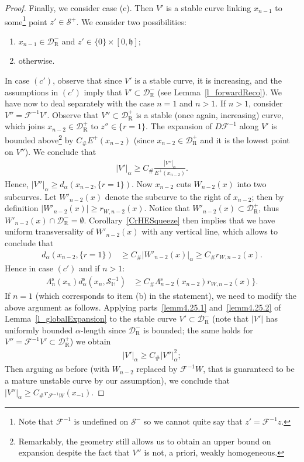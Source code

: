 \documentclass[10pt]{amsart}
\theoremstyle{definition}\newtheorem{defi}[theo]{Definition}\newtheorem{rema}[theo]{Remark}\newtheorem{exam}[theo]{Example}\newtheorem{exem}[theo]{Example}\newtheorem{nota}[theo]{Notation}
\newcommand{\ct}{r}
\newcommand{\const}{C_\#}
\newcommand{\inv}{^{-1}}
\newcommand{\stable}{\text{s}}
\newcommand{\homo}{\mathbb{H}}
\newcommand{\cm}{\mathcal{F}}
\newcommand{\cell}{\mathcal{D}}
\newcommand{\slopeb}{\mathfrak{h}}
\newcommand{\recoPrivate}{\mathrm{R}}
\newcommand{\reco}{{\cell^-_{\recoPrivate}}}
\newcommand{\backReco}{{\cell^+_{\recoPrivate}}}
\newcommand{\dadm}[1]{\dadmPrivate^{#1}}
\newcommand{\dadmPrivate}{d\adm}
\newcommand{\ds}{\dadmPrivate^{\stable}}
\newcommand{\singPrivate}{\mathcal{S}}
\newcommand{\hsing}[1]{{\singPrivate}_\homo^{#1}}
\newcommand{\singForward}[1]{\singPrivate^+_{#1}}
\newcommand{\singBackward}[1]{\singPrivate^-_{#1}}
\newcommand{\adm}{_{\alpha^{+}}}
\newcommand{\admName}{\alpha^{+}}
\renewcommand{\admName}{\alpha}
\renewcommand{\adm}{_{\alpha}}
\renewcommand{\dadm}{d\adm}
\begin{document}
\begin{proof}
Finally, we consider case (c). Then $V'$ is a stable curve linking $x_{n-1}$ to some\footnote{ Note that $\cm\inv$ is undefined on $\singBackward{}$ so we cannot quite say that $z' = \cm\inv z$.} point $z'\in\singForward{}$. We consider two possibilities:
\begin{enumerate}
\item[$(c')$] $x_{n-1}\in\reco$ and $z'\in\{0\}\times[0,\slopeb]$;
\item[$(c'')$] otherwise.
\end{enumerate}
In case $(c')$, observe that since $V'$ is a stable curve, it is increasing, and the assumptions in $(c')$ imply that $V'\subset\reco$ (see Lemma~\ref{l_forwardReco}). We have now to deal separately with the case $n = 1$ and $n > 1$. If $n > 1$, consider $V'' = \cm\inv V'$. Observe that $V''\subset\backReco$ is a stable (once again, increasing) curve, which joins $x_{n-2}\in\backReco$ to $z''\in\{\ct = 1\}$. The expansion of $D\cm\inv$ along $V'$ is bounded above\footnote{ Remarkably, the geometry still allows us to obtain an upper bound on expansion despite the fact that $V''$ is not, a priori, weakly homogeneous.} by $\const E^{+}(x_{n-2})$ (since $x_{n-2}\in\backReco$ and it is the lowest point on $V''$). We conclude that
\begin{align*}
|V'|\adm\ge \const \frac{|V''|\adm}{E^{+}(x_{n-2})}.
\end{align*}
Hence, $|V''|\adm\ge \dadm(x_{n-2},\{\ct = 1\})$. Now $x_{n-2}$ cuts $W_{n-2}(x)$ into two subcurves. Let $W'_{n-2}(x)$ denote the subcurve to the right of $x_{n-2}$; then by definition $|W'_{n-2}(x)|\ge r_{W,n-2}(x)$. Notice that $W'_{n-2}(x)\subset\backReco$, thus $W'_{n-2}(x)\cap\reco = \emptyset$. Corollary~\ref{CrHESqueeze} then implies that we have uniform transversality of $W'_{n-2}(x)$ with any vertical line, which allows to conclude that
\begin{align*}
\dadm{}(x_{n-2},\{\ct = 1\}) &\ge \const |W'_{n-2}(x)|\adm\ge \const r_{W,n-2}(x).
\end{align*}
Hence in case $(c')$ and if $n > 1$:
\begin{align*}
\Lambda^{\stable}_{n}(x_{n})\ds(x_{n},\hsing{-1}) &\ge \const
\Lambda^{\stable}_{n-2}(x_{n-2})r_{W,n-2}(x)\}.
\end{align*}
If $n = 1$ (which corresponds to item (b) in the statement), we need to modify the above argument as follows. Applying parts~\eqref{lemm4.25.1} and~\eqref{lemm4.25.2} of Lemma~\ref{l_globalExpansion} to the stable curve $V'\subset\reco$ (note that $|V'|$ has uniformly bounded $\admName{}$-length since $\reco$ is bounded; the same holds for $V'' = \cm\inv V'\subset\backReco$) we obtain
\begin{align*}
|V'|\adm \ge \const |V''|\adm^{2};
\end{align*}
Then arguing as before (with $W_{n-2}$ replaced by $\cm\inv W$, that is guaranteed to be a mature unstable curve by our assumption), we conclude that $|V''|\adm\ge \const r_{\cm\inv W}(x_{-1})$.


\end{proof}
\end{document}
